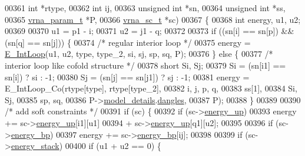 \begin{DoxyCode}
00361                    \textcolor{keywordtype}{int}            *rtype,
00362                    \textcolor{keywordtype}{int}            ij,
00363                    \textcolor{keywordtype}{unsigned} \textcolor{keywordtype}{int}   *sn,
00364                    \textcolor{keywordtype}{unsigned} \textcolor{keywordtype}{int}   *ss,
00365                    \hyperlink{group__energy__parameters_structvrna__param__s}{vrna\_param\_t}   *P,
00366                    \hyperlink{group__soft__constraints_structvrna__sc__s}{vrna\_sc\_t}      *sc)
00367 \{
00368   \textcolor{keywordtype}{int} energy, u1, u2;
00369 
00370   u1  = p1 - i;
00371   u2  = j1 - q;
00372 
00373   \textcolor{keywordflow}{if} ((sn[i] == sn[p]) && (sn[q] == sn[j])) \{
00374     \textcolor{comment}{/* regular interior loop */}
00375     energy = \hyperlink{group__eval__deprecated_gaafbc187b7f78e8e82afb77dd6f3b8fc5}{E\_IntLoop}(u1, u2, type, type\_2, si, sj, sp, sq, P);
00376   \} \textcolor{keywordflow}{else} \{
00377     \textcolor{comment}{/* interior loop like cofold structure */}
00378     \textcolor{keywordtype}{short} Si, Sj;
00379     Si      = (sn[i1] == sn[i]) ? si : -1;
00380     Sj      = (sn[j] == sn[j1]) ? sj : -1;
00381     energy  = E\_IntLoop\_Co(rtype[type], rtype[type\_2],
00382                            i, j, p, q,
00383                            ss[1],
00384                            Si, Sj,
00385                            sp, sq,
00386                            P->\hyperlink{group__energy__parameters_a7b84353eb9075c595bad4ceb871bcae7}{model\_details}.\hyperlink{group__model__details_adcda4ff2ea77748ae0e8700288282efc}{dangles},
00387                            P);
00388   \}
00389 
00390   \textcolor{comment}{/* add soft constraints */}
00391   \textcolor{keywordflow}{if} (sc) \{
00392     \textcolor{keywordflow}{if} (sc->\hyperlink{group__soft__constraints_a57e4dbb924ab11f304e3762a3a9b07a1}{energy\_up})
00393       energy += sc->\hyperlink{group__soft__constraints_a57e4dbb924ab11f304e3762a3a9b07a1}{energy\_up}[i1][u1]
00394                 + sc->\hyperlink{group__soft__constraints_a57e4dbb924ab11f304e3762a3a9b07a1}{energy\_up}[q1][u2];
00395 
00396     \textcolor{keywordflow}{if} (sc->\hyperlink{group__soft__constraints_ad139b8e06632e00cbcf3909815d0d03d}{energy\_bp})
00397       energy += sc->\hyperlink{group__soft__constraints_ad139b8e06632e00cbcf3909815d0d03d}{energy\_bp}[ij];
00398 
00399     \textcolor{keywordflow}{if} (sc->\hyperlink{group__soft__constraints_ac20dded6068e81acd0f1139092f66a22}{energy\_stack})
00400       \textcolor{keywordflow}{if} (u1 + u2 == 0) \{

\end{DoxyCode}
